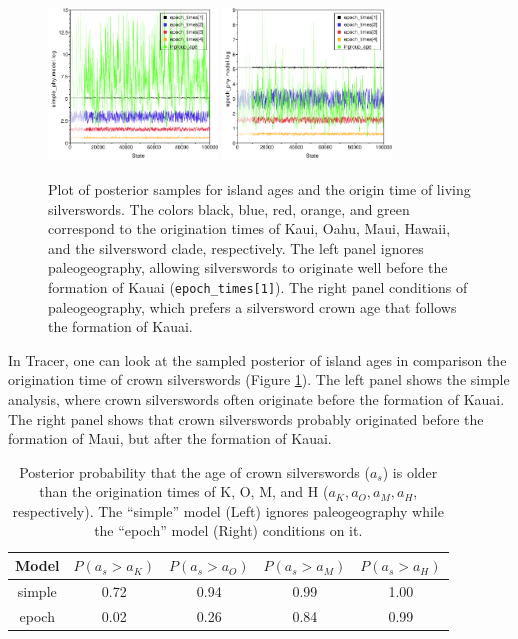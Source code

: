 \begin{figure}[!h]
\centering
\includegraphics[width=0.4\textwidth]{figures/fig_simple_ages.pdf} \includegraphics[width=0.4\textwidth]{figures/fig_epoch_ages.pdf} 

\caption{Plot of posterior samples for island ages and the origin time of living silverswords.
The colors black, blue, red, orange, and green correspond to the origination times of Kaui, Oahu, Maui, Hawaii, and the silversword clade, respectively.
The left panel ignores paleogeography, allowing silverswords to originate well before the formation of Kauai ({\tt epoch\_times[1]}).
The right panel conditions of paleogeography, which prefers a silversword crown age that follows the formation of Kauai.}
\label{fig:epoch_ages}
\end{figure}


In Tracer, one can look at the sampled posterior of island ages in comparison the origination time of crown silverswords (Figure \ref{fig:epoch_ages}).
The left panel shows the simple analysis, where crown silverswords often originate before the formation of Kauai.
The right panel shows that crown silverswords probably originated before the formation of Maui, but after the formation of Kauai.

\begin{table}[!h]
\centering
\begin{tabular}{c|cccc}
Model       & $P(a_s>a_K)$ & $P(a_s>a_O)$ & $P(a_s>a_M)$ & $P(a_s>a_H)$ \\ \hline
simple & 0.72 & 0.94 & 0.99 & 1.00 \\
epoch & 0.02 & 0.26 & 0.84 & 0.99 \\
\end{tabular}
\caption{Posterior probability that the age of crown silverswords ($a_s$) is older than the origination times of K, O, M, and H ($a_K, a_O, a_M, a_H$, respectively). The ``simple'' model (Left) ignores paleogeography while the ``epoch'' model (Right) conditions on it.}
\label{tab:epoch_ages}
\end{table}

